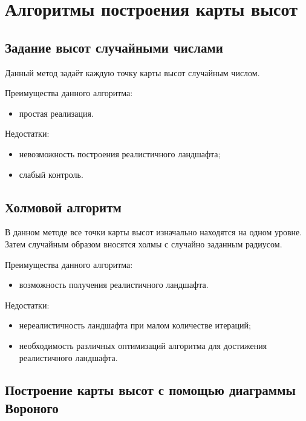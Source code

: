 \section{Алгоритмы построения карты высот}

\subsection{Задание высот случайными числами}

Данный метод задаёт каждую точку карты высот случайным числом.

Преимущества данного алгоритма:

\begin{itemize}
	\item простая реализация.
\end{itemize}

Недостатки:

\begin{itemize}
	\item невозможность построения реалистичного ландшафта;
	\item слабый контроль.
\end{itemize}

\subsection{Холмовой алгоритм}
В данном методе все точки карты высот изначально находятся на одном уровне. Затем случайным образом вносятся холмы с случайно заданным радиусом.

Преимущества данного алгоритма:

\begin{itemize}
	\item возможность получения реалистичного ландшафта.
\end{itemize}

Недостатки:

\begin{itemize}
	\item нереалистичность ландшафта при малом количестве итераций;
	\item необходимость различных оптимизаций алгоритма для достижения реалистичного ландшафта.
\end{itemize}

\subsection{Построение карты высот с помощью диаграммы Вороного}

